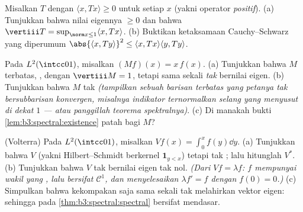 \begin{exercise}[$\star\star$]\label{exo:b3:spectral:5}
Misalkan $T$  dengan $\langle x, Tx\rangle \geq 0$ untuk
setiap $x$ (yakni operator \emph{positif}).
(a) Tunjukkan bahwa nilai eigennya $\geq 0$ dan bahwa $\vertiii T =
\sup_{\norm x\leq1}\langle x, Tx\rangle$.
(b) Buktikan ketaksamaan Cauchy--Schwarz yang diperumum
$\abs{\langle x, Ty\rangle}^2 \leq \langle x, Tx\rangle\langle
y, Ty\rangle$.
\end{exercise}

\begin{exercise}[$\star\star$]\label{exo:b3:spectral:6}
Pada $L^2(\intcc01)$, misalkan $(Mf)(x) = x\,f(x)$.
(a) Tunjukkan bahwa $M$ terbatas, , dengan $\vertiii M =
1$, tetapi sama sekali \emph{tak} bernilai eigen.
(b) Tunjukkan bahwa $M$ tak  \emph{(tampilkan sebuah barisan terbatas
yang petanya tak bersubbarisan konvergen, misalnya indikator ternormalkan
selang yang menyusut di dekat $1$ --- atau panggillah
teorema spektralnya)}.
(c) Di manakah bukti \cref{lem:b3:spectral:existence} patah
bagi $M$?
\end{exercise}

\begin{exercise}[$\star\star$]\label{exo:b3:spectral:7}
(Volterra) Pada $L^2(\intcc01)$, misalkan $Vf(x) = \int_0^xf(y)\dd
y$.
(a) Tunjukkan bahwa $V$  (yakni Hilbert--Schmidt berkernel $\mathbf
1_{y < x}$) tetapi tak ; lalu hitunglah $V^*$.
(b) Tunjukkan bahwa $V$ tak bernilai eigen tak nol. \emph{(Dari $Vf =
\lambda f$: $f$ mempunyai wakil yang , lalu bersifat
$\mathcal C^1$, dan menyelesaikan $\lambda f' = f$ dengan $f(0) = 0$.)}
(c) Simpulkan bahwa kekompakan saja sama sekali tak melahirkan vektor eigen:
sehingga  pada \cref{thm:b3:spectral:spectral} bersifat
mendasar.
\end{exercise}

